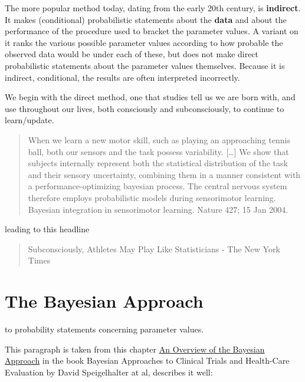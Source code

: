 \documentclass[]{book}
\begin{document}
The more popular method today, dating from the early 20th century, is \textbf{indirect}. It makes (conditional) probabilistic statements about the \textbf{data} and about the performance of the procedure used to bracket the parameter values. A variant on it ranks the various possible parameter values according to how probable the observed data would be under each of these, but does not make direct probabilistic statements about the parameter values themselves. Because it is indirect, conditional, the results are often interpreted incorrectly.

We begin with the direct method, one that studies tell us we are born with, and use throughout our lives, both consciously and subconsciously, to continue to learn/update.

\begin{quote}
When we learn a new motor skill, such as playing an approaching
tennis ball, both our sensors and the task possess variability.
{[}\ldots{}{]} We show that subjects internally represent both the statistical
distribution of the task and their sensory uncertainty,
combining them in a manner consistent with a performance-optimizing bayesian process. The central nervous system therefore employs probabilistic models during sensorimotor learning. Bayesian integration in sensorimotor learning. Nature 427; 15 Jan 2004.
\end{quote}

leading to this headline

\begin{quote}
Subconsciously, Athletes May Play Like Statisticians - The New York Times
\end{quote}

\hypertarget{the-bayesian-approach}{%
\section{The Bayesian Approach}\label{the-bayesian-approach}}

to probability statements concerning parameter values.

This paragraph is taken from this chapter
\href{http://www.medicine.mcgill.ca/epidemiology/hanley/bios601/ch10Bayes/an\%20overview\%20of\%20the\%20Bayesian\%20approach.pdf}{An Overview of the Bayesian Approach}
in the book Bayesian Approaches to Clinical Trials and Health-Care Evaluation by David Speigelhalter at al, describes it well:
\end{document}
